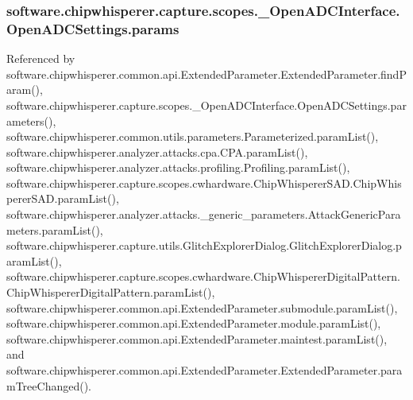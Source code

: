 \subsubsection[{params}]{\setlength{\rightskip}{0pt plus 5cm}software.\+chipwhisperer.\+capture.\+scopes.\+\_\+\+Open\+A\+D\+C\+Interface.\+Open\+A\+D\+C\+Settings.\+params}\label{classsoftware_1_1chipwhisperer_1_1capture_1_1scopes_1_1__OpenADCInterface_1_1OpenADCSettings_a3960ea44ed3b683742654656f8dc56d7}


Referenced by software.\+chipwhisperer.\+common.\+api.\+Extended\+Parameter.\+Extended\+Parameter.\+find\+Param(), software.\+chipwhisperer.\+capture.\+scopes.\+\_\+\+Open\+A\+D\+C\+Interface.\+Open\+A\+D\+C\+Settings.\+parameters(), software.\+chipwhisperer.\+common.\+utils.\+parameters.\+Parameterized.\+param\+List(), software.\+chipwhisperer.\+analyzer.\+attacks.\+cpa.\+C\+P\+A.\+param\+List(), software.\+chipwhisperer.\+analyzer.\+attacks.\+profiling.\+Profiling.\+param\+List(), software.\+chipwhisperer.\+capture.\+scopes.\+cwhardware.\+Chip\+Whisperer\+S\+A\+D.\+Chip\+Whisperer\+S\+A\+D.\+param\+List(), software.\+chipwhisperer.\+analyzer.\+attacks.\+\_\+generic\+\_\+parameters.\+Attack\+Generic\+Parameters.\+param\+List(), software.\+chipwhisperer.\+capture.\+utils.\+Glitch\+Explorer\+Dialog.\+Glitch\+Explorer\+Dialog.\+param\+List(), software.\+chipwhisperer.\+capture.\+scopes.\+cwhardware.\+Chip\+Whisperer\+Digital\+Pattern.\+Chip\+Whisperer\+Digital\+Pattern.\+param\+List(), software.\+chipwhisperer.\+common.\+api.\+Extended\+Parameter.\+submodule.\+param\+List(), software.\+chipwhisperer.\+common.\+api.\+Extended\+Parameter.\+module.\+param\+List(), software.\+chipwhisperer.\+common.\+api.\+Extended\+Parameter.\+maintest.\+param\+List(), and software.\+chipwhisperer.\+common.\+api.\+Extended\+Parameter.\+Extended\+Parameter.\+param\+Tree\+Changed().

\hypertarget{classsoftware_1_1chipwhisperer_1_1capture_1_1scopes_1_1__OpenADCInterface_1_1OpenADCSettings_ab9630feaeb46b6142c46a0509e6fe81a}{}
